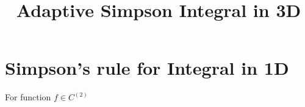 \documentclass[12ex]{article}
\title{Adaptive Simpson Integral in 3D}
\begin{document}
	\maketitle
	\section{Simpson's rule for Integral in 1D}
	For function $f\in C^{(2)}$
\end{document}
